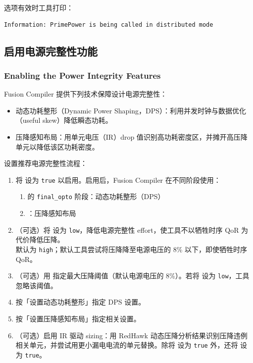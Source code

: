 选项有效时工具打印：
\begin{lstlisting}
Information: PrimePower is being called in distributed mode
\end{lstlisting}

\subsection{启用电源完整性功能}
\subsubsection*{Enabling the Power Integrity Features}

Fusion Compiler 提供下列技术保障设计电源完整性：
\begin{itemize}
  \item 动态功耗整形（Dynamic Power Shaping，DPS）：利用并发时钟与数据优化（useful skew）降低瞬态功耗。
  \item 压降感知布局：用单元电压（IR）drop 值识别高功耗密度区，并摊开高压降单元以降低该区功耗密度。
\end{itemize}

设置推荐电源完整性流程：
\begin{enumerate}
  \item 将  设为 \texttt{true} 以启用。启用后，Fusion Compiler 在不同阶段使用：
        \begin{enumerate}
          \item {} 的 \texttt{final\_opto} 阶段：动态功耗整形（DPS）
          \item {}：压降感知布局
        \end{enumerate}
  \item （可选）将  设为 \texttt{low}，降低电源完整性 effort，使工具不以牺牲时序 QoR 为代价降低压降。\\
        默认为 \texttt{high}；默认工具尝试将压降降至电源电压的 8\% 以下，即使牺牲时序 QoR。
  \item （可选）用  指定最大压降阈值（默认电源电压的 8\%）。若将  设为 \texttt{low}，工具忽略该阈值。
  \item 按「设置动态功耗整形」指定 DPS 设置。
  \item 按「设置压降感知布局」指定相关设置。
  \item （可选）启用 IR 驱动 sizing：用 RedHawk 动态压降分析结果识别压降违例相关单元，并尝试用更小漏电电流的单元替换。除将  设为 \texttt{true} 外，还将  设为 \texttt{true}。
\end{enumerate}

